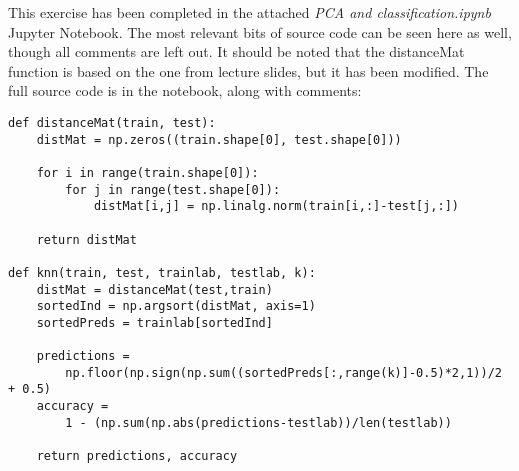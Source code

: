 This exercise has been completed in the attached \textit{PCA and classification.ipynb} Jupyter Notebook. The most relevant bits of source code can be seen here as well, though all comments are left out. It should be noted that the distanceMat function is based on the one from lecture slides, but it has been modified. The full source code is in the notebook, along with comments:
\begin{verbatim}
def distanceMat(train, test):
    distMat = np.zeros((train.shape[0], test.shape[0]))
    
    for i in range(train.shape[0]):
        for j in range(test.shape[0]):
            distMat[i,j] = np.linalg.norm(train[i,:]-test[j,:])
            
    return distMat

def knn(train, test, trainlab, testlab, k):
    distMat = distanceMat(test,train)
    sortedInd = np.argsort(distMat, axis=1)
    sortedPreds = trainlab[sortedInd]
    
    predictions = 
        np.floor(np.sign(np.sum((sortedPreds[:,range(k)]-0.5)*2,1))/2 + 0.5)
    accuracy = 
        1 - (np.sum(np.abs(predictions-testlab))/len(testlab))
    
    return predictions, accuracy
\end{verbatim}